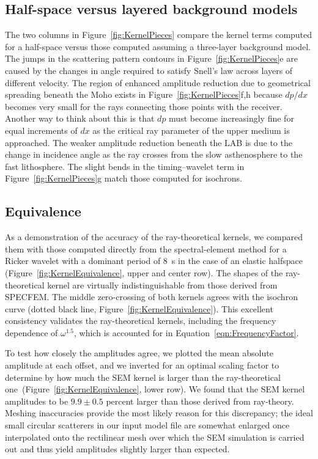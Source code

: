 \documentclass[referee]{gji}
\begin{document}
\subsection{Half-space versus layered background models}

The two columns in Figure~\ref{fig:KernelPieces} compare the kernel terms computed for a half-space versus those computed assuming a three-layer background model. The jumps in the scattering pattern contours in Figure~\ref{fig:KernelPieces}e  are caused by the changes in angle required to satisfy Snell's law across layers of different velocity.  The region of enhanced amplitude reduction due to geometrical spreading beneath the Moho exists in Figure~\ref{fig:KernelPieces}f,h because $dp/dx$ becomes very small for the rays connecting those points with the receiver.  Another way to think about this is that $dp$ must become increasingly fine for equal increments of $dx$ as the critical ray parameter of the upper medium is approached.  The weaker amplitude reduction beneath the LAB is due to the change in incidence angle as the ray crosses from the slow asthenosphere to the fast lithosphere.  The slight bends in the timing--wavelet term in Figure~\ref{fig:KernelPieces}g match those computed for isochrons.

\subsection{Equivalence}

As a demonstration of the accuracy of the ray-theoretical kernels, we compared them with those computed directly from the spectral-element method for a Ricker wavelet with a dominant period of 8~s in the case of an elastic halfspace (Figure~\ref{fig:KernelEquivalence}, upper and center row). The shapes of the ray-theoretical kernel are virtually indistinguishable from those derived from SPECFEM.  The middle zero-crossing of both kernels agrees with the isochron curve (dotted black line, Figure~\ref{fig:KernelEquivalence}).  This excellent consistency validates the ray-theoretical kernels, including the frequency dependence of $\omega^{1.5}$, which is accounted for in Equation~\ref{eqn:FrequencyFactor}.

To test how closely the amplitudes agree, we plotted the mean absolute amplitude at each offset, and we inverted for an optimal scaling factor to determine by how much the SEM kernel is larger than the ray-theoretical one\ (Figure~\ref{fig:KernelEquivalence}, lower row).  We found that the SEM kernel amplitudes to be $9.9\pm0.5$ percent larger than those derived from ray-theory. Meshing inaccuracies provide the most likely reason for this discrepancy; the ideal small circular scatterers in our input model file are somewhat enlarged once interpolated onto the rectilinear mesh over which the SEM simulation is carried out and thus yield amplitudes slightly larger than expected.
\end{document}
